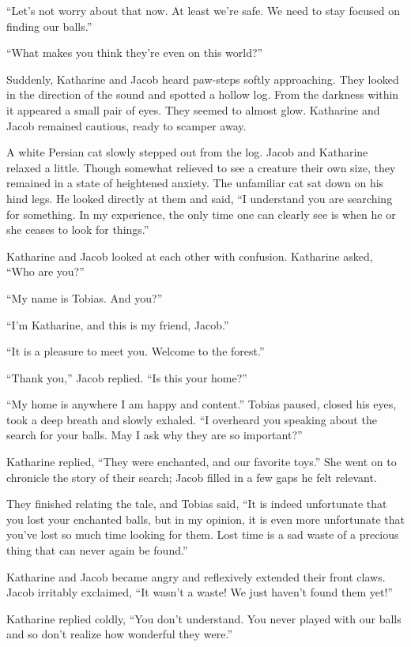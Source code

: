 “Let's not worry about that now. At least we're safe. We need to stay focused on finding our balls.”

“What makes you think they're even on this world?”

Suddenly, Katharine and Jacob heard paw-steps softly approaching. They looked in the direction of the sound and spotted a hollow log. From the darkness within it appeared a small pair of eyes. They seemed to almost glow. Katharine and Jacob remained cautious, ready to scamper away.

A white Persian cat slowly stepped out from the log. Jacob and Katharine relaxed a little. Though somewhat relieved to see a creature their own size, they remained in a state of heightened anxiety. The unfamiliar cat sat down on his hind legs. He looked directly at them and said, “I understand you are searching for something. In my experience, the only time one can clearly see is when he or she ceases to look for things.”

Katharine and Jacob looked at each other with confusion. Katharine asked, “Who are you?”

“My name is Tobias. And you?”

“I'm Katharine, and this is my friend, Jacob.”

“It is a pleasure to meet you. Welcome to the forest.”

“Thank you,” Jacob replied. “Is this your home?”

“My home is anywhere I am happy and content.” Tobias paused, closed his eyes, took a deep breath and slowly exhaled. “I overheard you speaking about the search for your balls. May I ask why they are so important?”

Katharine replied, “They were enchanted, and our favorite toys.” She went on to chronicle the story of their search; Jacob filled in a few gaps he felt relevant.

They finished relating the tale, and Tobias said, “It is indeed unfortunate that you lost your enchanted balls, but in my opinion, it is even more unfortunate that you've lost so much time looking for them. Lost time is a sad waste of a precious thing that can never again be found.”

Katharine and Jacob became angry and reflexively extended their front claws. Jacob irritably exclaimed, “It wasn't a waste! We just haven't found them yet!”

Katharine replied coldly, “You don't understand. You never played with our balls and so don't realize how wonderful they were.”

